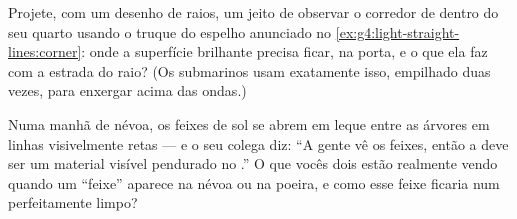 \begin{exercise}[$\star\star$]\label{exo:g4:light-straight-lines:10}
Projete, com um desenho de raios, um jeito de observar o corredor de
dentro do seu quarto usando o truque do espelho anunciado no
\cref{ex:g4:light-straight-lines:corner}: onde a superfície
brilhante precisa ficar, na porta, e o que ela faz com a estrada do
raio? (Os submarinos usam exatamente isso, empilhado duas vezes, para
enxergar acima das ondas.)
\end{exercise}

\begin{exercise}[$\star\star$]\label{exo:g4:light-straight-lines:11}
Numa manhã de névoa, os feixes de sol se abrem em leque entre as
árvores em linhas visivelmente retas --- e o seu colega diz: ``A
gente vê os feixes, então a  deve ser um material visível
pendurado no .'' O que vocês dois estão realmente vendo quando um
``feixe'' aparece na névoa ou na poeira, e como esse feixe ficaria num
 perfeitamente limpo?
\end{exercise}
